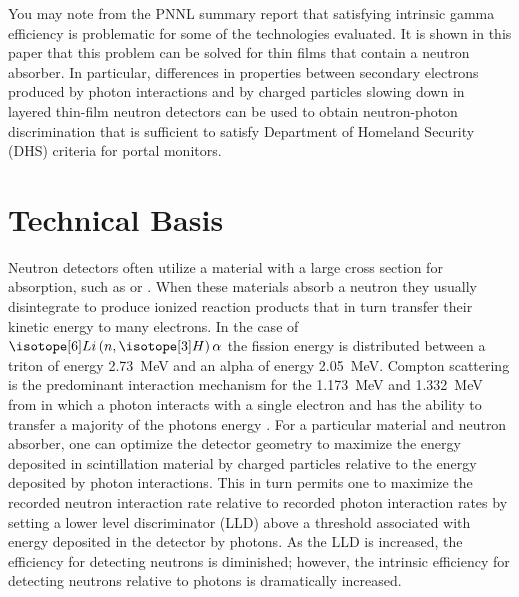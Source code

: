 \documentclass[draftcls,onecolumn]{IEEEtran}
\begin{document}
You may note from the PNNL summary report \cite{pnnl_18471}  that satisfying intrinsic gamma efficiency is problematic for some of the technologies evaluated.
It is shown in this paper that this problem can be solved for thin films that contain a neutron absorber.
In particular, differences in properties between secondary electrons produced by photon interactions and by charged particles slowing down in layered thin-film neutron detectors can be used to obtain neutron-photon discrimination that is sufficient to satisfy Department of Homeland Security (DHS) criteria for portal monitors.  


\section{Technical Basis}
Neutron detectors often utilize a material with a large cross section for absorption, such as  or .
When these materials absorb a neutron they usually disintegrate to produce ionized reaction products that in turn transfer their kinetic energy to many electrons.
In the case of $\iso[6]{Li}\left(n,\iso[3]{H}\right)\alpha$ the fission energy is distributed between a triton of energy \SI{2.73}{\mega\eV} and an alpha of energy \SI{2.05}{\mega\eV}.
Compton scattering is the predominant interaction mechanism for the \SI{1.173}{\mega\eV} and \SI{1.332}{\mega\eV} from  in which a photon interacts with a single electron and has the ability to transfer a majority of the photons energy \cite{turner_atoms_2008}.
For a particular material and neutron absorber, one can optimize the detector geometry to maximize the energy deposited in scintillation material by charged particles relative to the energy deposited by photon interactions. 
This in turn permits one to maximize the recorded neutron interaction rate relative to recorded photon interaction rates by setting a lower level discriminator (LLD) above a threshold associated with energy deposited in the detector by photons.  
As the LLD is increased, the efficiency for detecting neutrons is diminished; however, the intrinsic efficiency for detecting neutrons relative to photons is dramatically increased. 
\end{document}
